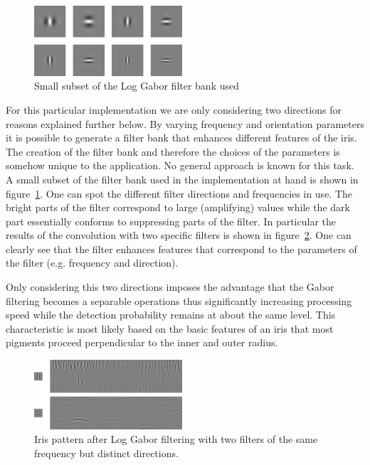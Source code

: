 \documentclass[journal]{IEEEtran}
\begin{document}
\begin{figure}[t]
	\centering
  \includegraphics[width=0.49\textwidth]{iris/2d_log_gabor_filter.png}
	\caption{Small subset of the Log Gabor filter bank used}
	\label{fig:filter_bank}
\end{figure}

\par For this particular implementation we are only considering two directions for reasons explained further below. By varying frequency and orientation parameters it is possible to generate a filter bank that enhances different features of the iris. The creation of the filter bank and therefore the choices of the parameters is somehow unique to the application. No general approach is known for this task. 
A small subset of the filter bank used in the implementation at hand is shown in figure~\ref{fig:filter_bank}. One can spot the different filter directions and frequencies in use. The bright parts of the filter correspond to large (amplifying) values while the dark part essentially conforms to suppressing parts of the filter. In particular the results of the convolution with two specific filters is shown in figure~\ref{fig:convolution_result}. One can clearly see that the filter enhances features that correspond to the parameters of the filter (e.g. frequency and direction).
\par Only considering this two directions imposes the advantage that the Gabor filtering becomes a separable operations thus significantly increasing processing speed while the detection probability remains at about the same level. This characteristic is most likely based on the basic features of an iris that most pigments proceed perpendicular to the inner and outer radius.

\begin{figure}[t]
	\centering
  \includegraphics[width=0.49\textwidth]{iris/pattern_gen.png}
	\caption{Iris pattern after Log Gabor filtering with two filters of the same frequency but distinct directions.}
	\label{fig:convolution_result}
\end{figure}
\end{document}
